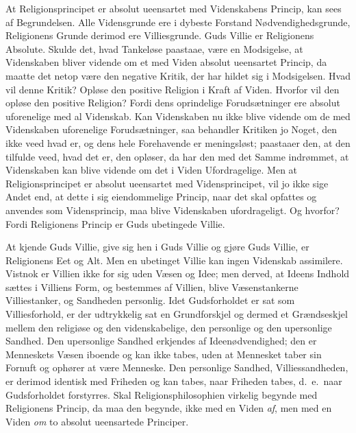 \documentclass[12pt]{book}
\begin{document}
At Religionsprincipet er absolut ueensartet med Videnskabens
Princip, kan sees af Begrundelsen. Alle Vidensgrunde ere i dybeste
Forstand Nødvendighedsgrunde, Religionens Grunde derimod ere
Villiesgrunde. Guds Villie er Religionens Absolute. Skulde det, hvad
Tankeløse paastaae, være en Modsigelse, at Videnskaben bliver
vidende om et med Viden absolut ueensartet Princip, da maatte det
netop være den negative Kritik, der har hildet sig i Modsigelsen.
Hvad vil denne Kritik? Opløse den positive Religion i Kraft af
Viden. Hvorfor vil den opløse den positive Religion? Fordi dens
oprindelige Forudsætninger ere absolut uforenelige med al Videnskab.
Kan Videnskaben nu ikke blive vidende om de med Videnskaben
uforenelige Forudsætninger, saa behandler Kritiken jo Noget, den
ikke veed hvad er, og dens hele Forehavende er meningsløst;
paastaaer den, at den tilfulde veed, hvad det er, den opløser, da
har den med det Samme indrømmet, at Videnskaben kan blive vidende om
det i Viden Ufordragelige. Men at Religionsprincipet er absolut
ueensartet med Vidensprincipet, vil jo ikke sige Andet end, at dette
i sig eiendommelige Princip, naar det skal opfattes og anvendes som
Vidensprincip, maa blive Videnskaben ufordrageligt. Og hvorfor?
Fordi Religionens Princip er Guds ubetingede Villie.

At kjende Guds Villie, give sig hen i Guds Villie
og gjøre Guds Villie, er Religionens Eet og Alt. Men en ubetinget
Villie kan ingen Videnskab assimilere. Vistnok er Villien ikke for
sig uden Væsen og Idee; men derved, at Ideens Indhold sættes i
Villiens Form, og bestemmes af Villien, blive Væsenstankerne
Villiestanker, og Sandheden personlig. Idet Gudsforholdet er sat som
Villiesforhold, er der udtrykkelig sat en Grundforskjel og dermed et
Grændseskjel mellem den religiøse og den videnskabelige, den
personlige og den upersonlige Sandhed. Den upersonlige Sandhed
erkjendes af Ideenødvendighed; den er Menneskets Væsen iboende og
kan ikke tabes, uden at Mennesket taber sin Fornuft og ophører at
være Menneske. Den personlige Sandhed, Villiessandheden, er derimod
identisk med Friheden og kan tabes, naar Friheden tabes, d.\ e.\
naar Gudsforholdet forstyrres. Skal Religionsphilosophien virkelig
begynde med Religionens Princip, da maa den begynde, ikke med en
Viden \emph{af}, men med en Viden \emph{om} to absolut ueensartede
Principer.
\end{document}
